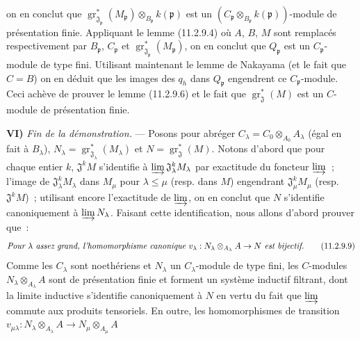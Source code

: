 on en conclut que
$\operatorname{gr}_{\mathfrak J_\mathfrak p}^*(M_\mathfrak p)
\otimes_{B_\mathfrak p}k(\mathfrak p)$ est un
$(C_\mathfrak p\otimes_{B_\mathfrak p}k(\mathfrak p))$-module de présentation
finie. Appliquant le lemme (11.2.9.4) où $A$, $B$, $M$ sont remplacés
respectivement par $B_\mathfrak p$, $C_\mathfrak p$ et
$\operatorname{gr}_{\mathfrak J_\mathfrak p}^*(M_\mathfrak p)$, on en conclut
que $Q_\mathfrak p$ est un $C_\mathfrak p$-module de type fini. Utilisant
maintenant le lemme de Nakayama (et le fait que $C=B$) on en déduit que les
images des $q_h$ dans $Q_\mathfrak p$ engendrent ce $C_\mathfrak p$-module.
Ceci achève de prouver le lemme (11.2.9.6) et le fait que
$\operatorname{gr}_{\mathfrak J}^*(M)$ est un $C$-module de présentation
finie.

\medskip
\noindent\textbf{VI)} \emph{Fin de la démonstration.} --- Posons pour abréger
$C_\lambda=C_0\otimes_{A_0}A_\lambda$ (égal en fait à $B_\lambda$),
$N_\lambda=\operatorname{gr}_{\mathfrak J_\lambda}^*(M_\lambda)$ et
$N=\operatorname{gr}_{\mathfrak J}^*(M)$. Notons d'abord que pour chaque
entier $k$, $\mathfrak J^kM$ s'identifie à
$\varinjlim\mathfrak J_\lambda^kM_\lambda$ par exactitude du foncteur
$\varinjlim$~; l'image de $\mathfrak J_\lambda^kM_\lambda$ dans $M_\mu$ pour
$\lambda\leq\mu$ (resp. dans $M$) engendrant $\mathfrak J_\mu^kM_\mu$
(resp. $\mathfrak J^kM$)~; utilisant encore l'exactitude de $\varinjlim$, on
en conclut que $N$ s'identifie canoniquement à $\varinjlim N_\lambda$. Faisant
cette identification, nous allons d'abord prouver que~:
\begin{equation}
\text{\emph{Pour $\lambda$ assez grand, l'homomorphisme canonique
$v_\lambda:N_\lambda\otimes_{A_\lambda}A\to N$ est bijectif.}}
\label{IV.11.2.9.9-fr}
\tag{11.2.9.9}
\end{equation}
Comme les $C_\lambda$ sont noethériens et $N_\lambda$ un $C_\lambda$-module
de type fini, les $C$-modules $N_\lambda\otimes_{A_\lambda}A$ sont de
présentation finie et forment un système inductif filtrant, dont la limite
inductive s'identifie canoniquement à $N$ en vertu du fait que $\varinjlim$
commute aux produits tensoriels. En outre, les homomorphismes de transition
$v_{\mu\lambda}:N_\lambda\otimes_{A_\lambda}A
\to N_\mu\otimes_{A_\mu}A$

